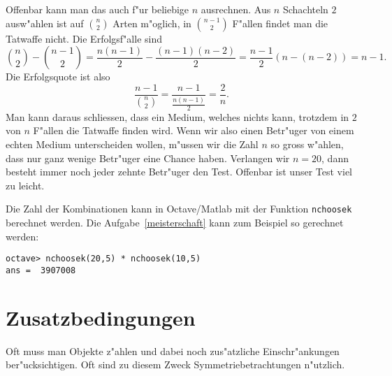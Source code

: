 \begin{beispiele}
\begin{loesung}
Offenbar kann man das auch f"ur beliebige $n$ ausrechnen. Aus $n$
Schachteln $2$ ausw"ahlen ist auf $\binom{n}2$ Arten m"oglich, in
$\binom{n-1}2$ F"allen findet man die Tatwaffe nicht. Die Erfolgsf"alle
sind
\[
\binom{n}2-\binom{n-1}2
=\frac{n(n-1)}2-\frac{(n-1)(n-2)}2
=\frac{n-1}2(n-(n-2))=n-1.
\]
Die Erfolgsquote ist also
\[
\frac{n-1}{\displaystyle\binom{n}2}=\frac{n-1}{\displaystyle\frac{n(n-1)}2}=\frac2n.
\]
Man kann daraus schliessen, dass ein Medium, welches nichts kann,
trotzdem in $2$ von $n$ F"allen die Tatwaffe finden wird.
Wenn wir also einen Betr"uger von einem echten Medium unterscheiden
wollen, m"ussen wir die Zahl $n$ so gross w"ahlen, dass nur ganz
wenige Betr"uger eine Chance haben. Verlangen wir $n=20$, dann
besteht immer noch jeder zehnte Betr"uger den Test. Offenbar ist unser
Test viel zu leicht.
\end{loesung}

\end{beispiele}
Die Zahl der Kombinationen kann in Octave/Matlab mit der Funktion
{\tt nchoosek} berechnet werden. Die Aufgabe~\ref{meisterschaft}
kann zum Beispiel so gerechnet werden:
\begin{verbatim}
octave> nchoosek(20,5) * nchoosek(10,5)
ans =  3907008
\end{verbatim}

\section{Zusatzbedingungen}
Oft muss man Objekte z"ahlen und dabei noch zus"atzliche Einschr"ankungen
ber"ucksichtigen. Oft sind zu diesem Zweck Symmetriebetrachtungen
n"utzlich.

